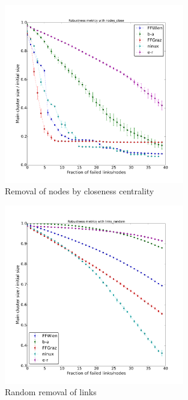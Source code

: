 \documentclass[a4paper,11pt,twoside,openright]{memoir}
\begin{document}
\begin{figure}[htbp]
\centering
\includegraphics[width=0.7\textwidth]{graphs/nodes_close_robustness}
\caption{Removal of nodes by closeness centrality}
\label{fig:node_close}
\end{figure}

\begin{figure}[htbp]
\centering
\includegraphics[width=0.7\textwidth]{graphs/links_random_robustness}
\caption{Random removal of links}
\label{fig:link_rand}
\end{figure}
\end{document}
